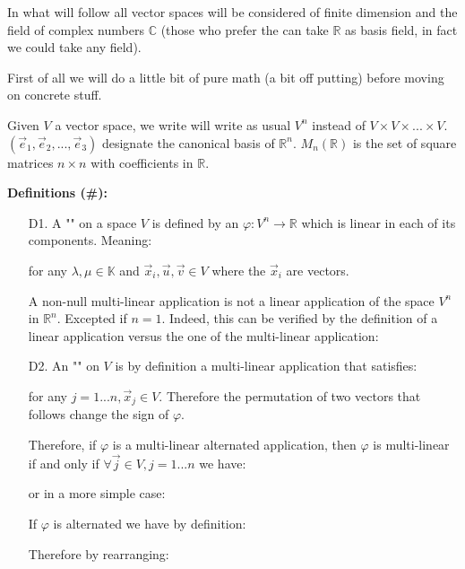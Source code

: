 	In what will follow all vector spaces will be considered of finite dimension and the field of complex numbers $\mathbb{C}$ (those who prefer the can take $\mathbb{R}$ as basis field, in fact we could take any field).
	
	First of all we will do a little bit of pure math (a bit off putting) before moving on  concrete stuff.
	
	Given $V$ a vector space, we write will write as usual $V^n$ instead of $V\times V\times... \times V$. $(\vec{e}_1,\vec{e}_2,...,\vec{e}_3)$ designate the canonical basis of $\mathbb{R}^n$. $M_n(\mathbb{R})$ is the set of square matrices $n\times n$ with coefficients in $\mathbb{R}$.
	
	\textbf{Definitions (\#\mydef):}
	\begin{enumerate}
		\item[D1.] A "" on a space $V$ is defined by an $\varphi: V^n \rightarrow \mathbb{R}$ which is linear in each of its components. Meaning:
		
		for any $\lambda,\mu\in \mathbb{K}$ and $\vec{x}_i,\vec{u},\vec{v}\in V$ where the $\vec{x}_i$ are vectors.
		\begin{tcolorbox}[title=Remark,colframe=black,arc=10pt]
		A non-null multi-linear application is not a linear application of the space $V^n$ in $\mathbb{R}^n$. Excepted if $n=1$. Indeed, this can be verified by the definition of a linear application  versus the one of the multi-linear application:
		
		\end{tcolorbox}
		\item[D2.] An "" on $V$ is by definition a multi-linear application that satisfies:
		
		for any $j=1...n,\vec{x}_j\in V$. Therefore the permutation of two vectors that follows change the sign of $\varphi$.
		\begin{theorem}
		Therefore, if $\varphi$ is a multi-linear alternated application, then $\varphi$ is multi-linear if and only if $\forall \vec{j}\in V,j=1...n$ we have:
		
		or in a more simple case:
		
		\end{theorem}
		\begin{dem}
		If $\varphi$ is alternated we have by definition:
		
		Therefore by rearranging:
		

\end{dem}
\end{enumerate}
